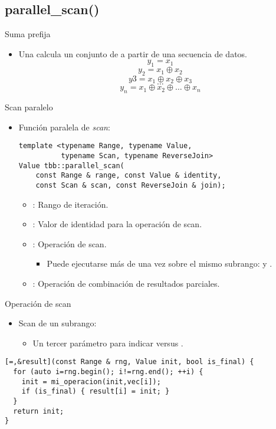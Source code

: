 \subsection{parallel\_scan()}

\begin{frame}[t]{Suma prefija}
\begin{itemize}
  \item Una  calcula un conjunto de 
         a partir de una secuencia de datos.
\[y_1 = x_1\]
\[y_2 = x_1 \oplus x_2\]
\[y3 = x_1 \oplus x_2 \oplus x_3\]
\[\dots\]
\[y_n = x_1 \oplus x_2 \oplus \ldots \oplus x_n\]
\end{itemize}
\end{frame}

\begin{frame}[t,fragile]{Scan paralelo}
\begin{itemize}
  \item Función paralela de \emph{scan}:
\begin{lstlisting}
template <typename Range, typename Value,
          typename Scan, typename ReverseJoin>
Value tbb::parallel_scan(
    const Range & range, const Value & identity,
    const Scan & scan, const ReverseJoin & join);                   
\end{lstlisting}
  \begin{itemize}
    \item {}: Rango de iteración.
    \item {}: Valor de identidad para la operación de scan.
    \item {}: Operación de scan.
      \begin{itemize}
        \item Puede ejecutarse más de una vez sobre el mismo subrango: 
               y .
      \end{itemize}
    \item {}: Operación de combinación de resultados parciales.
  \end{itemize}
\end{itemize}
\end{frame}

\begin{frame}[t,fragile]{Operación de scan}
\begin{itemize}
  \item Scan de un subrango:
    \begin{itemize}
      \item Un tercer parámetro para indicar  versus .
    \end{itemize}
\end{itemize}
\begin{lstlisting}
[=,&result](const Range & rng, Value init, bool is_final) {
  for (auto i=rng.begin(); i!=rng.end(); ++i) {
    init = mi_operacion(init,vec[i]);
    if (is_final) { result[i] = init; }
  }
  return init;
}
\end{lstlisting}
\end{frame}

